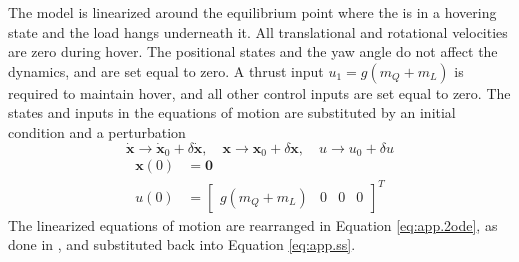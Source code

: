 The model is linearized around the equilibrium point where the  is in a hovering state and the load hangs underneath it. All translational and rotational velocities are zero during hover. The positional states and the yaw angle do not affect the dynamics, and are set equal to zero. A thrust input $ u_1=g(m_Q+m_L) $ is required to maintain hover, and all other control inputs are set equal to zero. 
The states and inputs in the equations of motion are substituted by an initial condition and a perturbation
\begin{equation}\label{key}
\mathbf{\dot{x}}\rightarrow\mathbf{\dot{x}}_0+\delta\mathbf{\dot{x}}, \quad \mathbf{{x}}\rightarrow\mathbf{{x}}_0+\delta\mathbf{{x}}, \quad u\rightarrow u_0+\delta u
\end{equation}
\begin{equation}\label{key}
\begin{aligned}
\mathbf{x}(0) &= \mathbf{0}\\
u(0)&=\begin{bmatrix}
g(m_Q+m_L) &0 &0& 0
\end{bmatrix}^T
\end{aligned}
\end{equation}
The linearized equations of motion are rearranged in Equation \ref{eq:app.2ode}, as done in \cite{Becker2013}, and substituted back into Equation \ref{eq:app.ss}.
